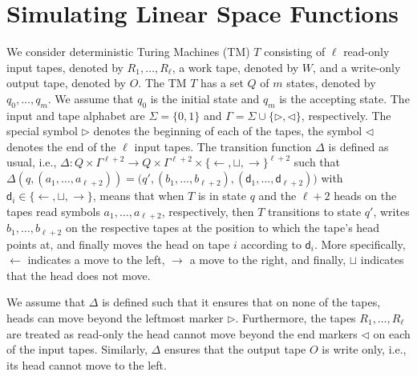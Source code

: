\section*{Simulating Linear Space Functions}
We consider  deterministic Turing Machines  (TM) $T$ consisting of $\ell$ read-only input tapes, denoted by $R_1,\ldots,R_\ell$,
a work tape, denoted by $W$, and a write-only output tape, denoted by $O$. The TM $T$ has a set $Q$ of $m$
states, denoted by $q_0,\ldots,q_m$. We assume that $q_0$ is the initial state and $q_m$ is the accepting state.
The input and tape alphabet are $\Sigma=\{0,1\}$ and $\Gamma=\Sigma\cup\{\rhd,\lhd\}$, respectively. The special symbol $\rhd$ denotes the beginning of each of the tapes, the symbol $\lhd$ denotes the end of the $\ell$ input tapes. The transition function $\Delta$ is defined as usual, i.e., 
$\Delta:Q\times \Gamma^{\ell+2} \to Q\times \Gamma^{\ell+2}\times \{\leftarrow,\sqcup,\rightarrow\}^{\ell+2}$ such that $\Delta(q,(a_1,\ldots,a_{\ell+2}))=\bigl(q',(b_1,\ldots,b_{\ell+2}),(\mathsf{d}_1,\ldots,\mathsf{d}_{\ell+2})\bigr)$ with $\mathsf{d}_i\in \{\leftarrow,\sqcup,\rightarrow\}$, means that when $T$ is in state $q$ and the $\ell+2$ heads on the tapes read symbols $a_1,\ldots,a_{\ell+2}$, respectively, then $T$ transitions to state $q'$, writes $b_1,\ldots,b_{\ell+2}$ on the respective tapes at the position to which the tape's head points at, and finally moves the head on tape $i$ according to $\mathsf{d}_i$. More specifically, $\leftarrow$  indicates a move to the left, 
$\rightarrow$ a move to the right, and finally, $\sqcup$ indicates that the head does not move.

We assume that $\Delta$ is defined such that it ensures that on none of the tapes, heads can move beyond the leftmost marker $\rhd$. Furthermore, the tapes $R_1,\ldots,R_\ell$ are treated as read-only the head cannot move beyond the end markers $\lhd$ on each of the input tapes. Similarly, $\Delta$ ensures that the output tape $O$ is write only, i.e., its head cannot move to the left. 

